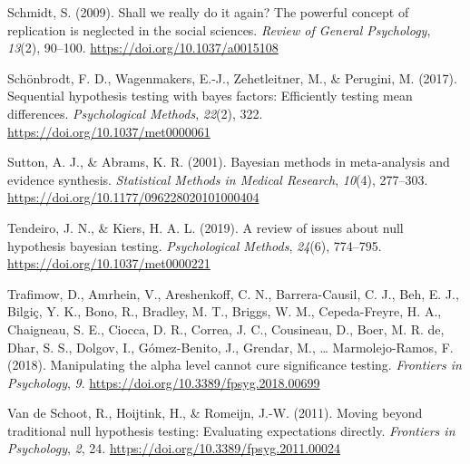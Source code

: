 \documentclass[
]{interact}
\newlength{\cslhangindent}
\newlength{\cslentryspacingunit} %
\newenvironment{CSLReferences}[2] %
    {%
  \setlength{\parindent}{0pt}
  \ifodd #1
  \let\oldpar\par
  \def\par{\hangindent=\cslhangindent\oldpar}
  \fi
  \setlength{\parskip}{#2\cslentryspacingunit}
 }%
 {}
\begin{document}
\begin{CSLReferences}{1}{0}
                    \leavevmode{}%
                    Schmidt, S. (2009). Shall we really do it again? The powerful concept of
                    replication is neglected in the social sciences. \emph{Review of General
                      Psychology}, \emph{13}(2), 90--100.
                    \url{https://doi.org/10.1037/a0015108}
                    
                    \leavevmode{}%
                    Schönbrodt, F. D., Wagenmakers, E.-J., Zehetleitner, M., \& Perugini, M.
                    (2017). Sequential hypothesis testing with bayes factors: Efficiently
                    testing mean differences. \emph{Psychological Methods}, \emph{22}(2),
                    322. \url{https://doi.org/10.1037/met0000061}
                    
                    \leavevmode{}%
                    Sutton, A. J., \& Abrams, K. R. (2001). Bayesian methods in
                    meta-analysis and evidence synthesis. \emph{Statistical Methods in
                      Medical Research}, \emph{10}(4), 277--303.
                    \url{https://doi.org/10.1177/096228020101000404}
                    
                    \leavevmode{}%
                    Tendeiro, J. N., \& Kiers, H. A. L. (2019). A review of issues about
                    null hypothesis bayesian testing. \emph{Psychological Methods},
                    \emph{24}(6), 774--795. \url{https://doi.org/10.1037/met0000221}
                    
                    \leavevmode{}%
                    Trafimow, D., Amrhein, V., Areshenkoff, C. N., Barrera-Causil, C. J.,
                    Beh, E. J., Bilgiç, Y. K., Bono, R., Bradley, M. T., Briggs, W. M.,
                    Cepeda-Freyre, H. A., Chaigneau, S. E., Ciocca, D. R., Correa, J. C.,
                    Cousineau, D., Boer, M. R. de, Dhar, S. S., Dolgov, I., Gómez-Benito,
                    J., Grendar, M., \ldots{} Marmolejo-Ramos, F. (2018). Manipulating the
                    alpha level cannot cure significance testing. \emph{Frontiers in
                      Psychology}, \emph{9}. \url{https://doi.org/10.3389/fpsyg.2018.00699}
                    
                    \leavevmode{}%
                    Van de Schoot, R., Hoijtink, H., \& Romeijn, J.-W. (2011). Moving beyond
                    traditional null hypothesis testing: Evaluating expectations directly.
                    \emph{Frontiers in Psychology}, \emph{2}, 24.
                    \url{https://doi.org/10.3389/fpsyg.2011.00024}
                    

\end{CSLReferences}
\end{document}
